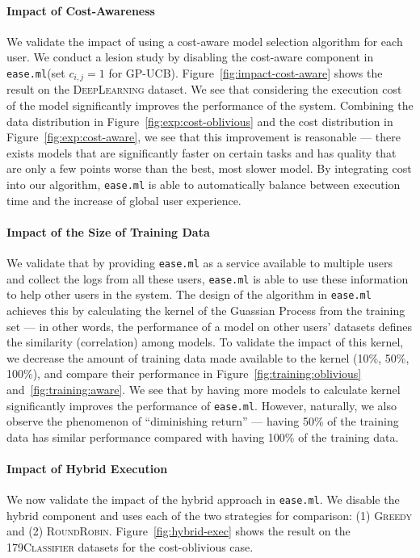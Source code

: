 \documentclass[letterpaper]{vldb}
\newcommand{\eml}{\texttt{ease.ml}\xspace}
\begin{document}
\vspace{-1em}
\paragraph*{Impact of Cost-Awareness}
We validate the impact of using 
a cost-aware model selection algorithm
for each user. We conduct a lesion
study by disabling the cost-aware
component in \eml (set $c_{i,j}=1$
for GP-UCB). Figure~\ref{fig:impact-cost-aware}
shows the result on the \textsc{DeepLearning} dataset.
We see that considering the
execution cost of the model significantly
improves the performance of the system.
Combining the data distribution in
Figure~\ref{fig:exp:cost-oblivious}
and the cost distribution in 
Figure~\ref{fig:exp:cost-aware},
we see that this improvement
is reasonable --- there exists
models that are significantly faster
on certain tasks and has quality that
are only a few points worse than the
best, most slower model. By integrating
cost into our algorithm, \eml is
able to automatically balance between
execution time and the increase of global
user experience.

\vspace{-1em}
\paragraph*{Impact of the Size of Training Data}

We validate that by providing \eml as
a service available to multiple users
and collect the logs from all these users,
\eml is able to use these information to
help other users in the system. The
design of the algorithm in \eml achieves
this by calculating the kernel of the Guassian Process from the training set --- in other words,
the performance of a model on other users'
datasets defines the similarity (correlation)
among models. To validate the impact
of this kernel, we decrease the amount
of training data made available to
the kernel (10\%, 50\%, 100\%), and compare their performance
in Figure~\ref{fig:training:oblivious} and~\ref{fig:training:aware}.
We see that by having more models to 
calculate kernel significantly improves
the performance of \eml. However, naturally,
we also observe the phenomenon of ``diminishing
return'' --- having 50\% of the
training data has similar performance
compared with having 100\% of the training data.

\vspace{-1em}
\paragraph*{Impact of Hybrid Execution}
We now validate the impact of the hybrid 
approach in \eml.
We disable the hybrid component and uses each
of the two strategies for comparison: (1)
\textsc{Greedy} and (2) \textsc{RoundRobin}.
Figure~\ref{fig:hybrid-exec} shows the result
on the \textsc{179Classifier} datasets
for the cost-oblivious case.
\end{document}
